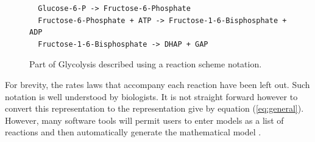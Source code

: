 \documentclass[12pt]{article}
\begin{document}
\begin{figure}[h]  \label{figure:script}
{\small
\begin{verbatim}
  Glucose-6-P -> Fructose-6-Phosphate
  Fructose-6-Phosphate + ATP -> Fructose-1-6-Bisphosphate + ADP
  Fructose-1-6-Bisphosphate -> DHAP + GAP
\end{verbatim} }
\caption {Part of Glycolysis described using a reaction scheme notation.}
\end{figure}


For brevity, the rates laws that accompany each
reaction have been left out. Such notation is well understood by biologists.
It is not straight forward however  to convert this representation to the
representation give by equation (\ref{eq:general}). However, many software
tools will permit users to enter models as a list of reactions and
then automatically generate the mathematical model
\cite{SauroF91,sauro:2000,Sauro:Omics}.
\end{document}
